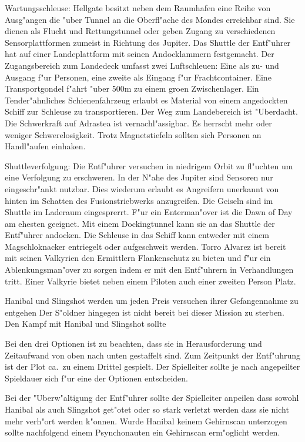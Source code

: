Wartungsschleuse: Hellgate besitzt neben dem Raumhafen eine Reihe von Ausg"angen die "uber Tunnel an die Oberfl"ache des Mondes erreichbar sind. Sie dienen als Flucht und Rettungstunnel oder geben Zugang zu verschiedenen Sensorplattformen zumeist in Richtung des Jupiter. Das Shuttle der Entf"uhrer hat auf einer Landeplattform mit seinen Andocklammern festgemacht. Der Zugangsbereich zum Landedeck umfasst zwei Luftschleu\3en: Eine als zu- und Ausgang f"ur Personen, eine zweite als Eingang f"ur Frachtcontainer. Eine Transportgondel f"ahrt "uber 500m zu einem gro\3en Zwischenlager. Ein Tender"ahnliches Schienenfahrzeug erlaubt es Material von einem angedockten Schiff zur Schleuse zu transportieren. Der Weg zum Landebereich ist "Uberdacht.  Die Schwerkraft auf Adrastea ist vernachl"assigbar. Es herrscht mehr oder weniger Schwerelosigkeit. Trotz Magnetstiefeln sollten sich Personen an Handl"aufen einhaken.

Shuttleverfolgung: Die Entf"uhrer versuchen in niedrigem Orbit zu fl"uchten um eine Verfolgung zu erschweren. In der N"ahe des Jupiter sind Sensoren nur eingeschr"ankt nutzbar. Dies wiederum erlaubt es Angreifern unerkannt von hinten im Schatten des Fusionstriebwerks anzugreifen. Die Geiseln sind im Shuttle im Laderaum eingesprerrt. F"ur ein Enterman"over ist die Dawn of Day am ehesten geeignet. Mit einem Dockingtunnel kann sie an das Shuttle der Entf"uhrer andocken. Die Schleuse in das Schiff kann entweder mit einem Magschlo\3knacker entriegelt oder aufgeschwei\3t werden. Torro Alvarez ist bereit mit seinen Valkyrien den Ermittlern Flankenschutz zu bieten und f"ur ein Ablenkungsman"over zu sorgen indem er mit den Entf"uhrern in Verhandlungen tritt. Einer Valkyrie bietet neben einem Piloten auch einer zweiten Person Platz.

Hanibal und Slingshot werden um jeden Preis versuchen ihrer Gefangennahme zu entgehen Der S"oldner hingegen ist nicht bereit bei dieser Mission zu sterben. Den Kampf mit Hanibal und Slingshot sollte

\begin{remarks}
	Bei den drei Optionen ist zu beachten, dass sie in Herausforderung und Zeitaufwand von oben nach unten gestaffelt sind. Zum Zeitpunkt der Entf"uhrung ist der Plot ca.~zu einem Drittel gespielt. Der Spielleiter sollte je nach angepeilter Spieldauer sich f"ur eine der Optionen entscheiden.

	Bei der "Uberw"altigung der Entf"uhrer sollte der Spielleiter anpeilen dass sowohl Hanibal als auch Slingshot get"otet oder so stark verletzt werden dass sie nicht mehr verh"ort werden k"onnen. Wurde Hanibal keinem Gehirnscan unterzogen sollte nachfolgend einem Psynchonauten ein Gehirnscan erm"oglicht werden.
\end{remarks}
